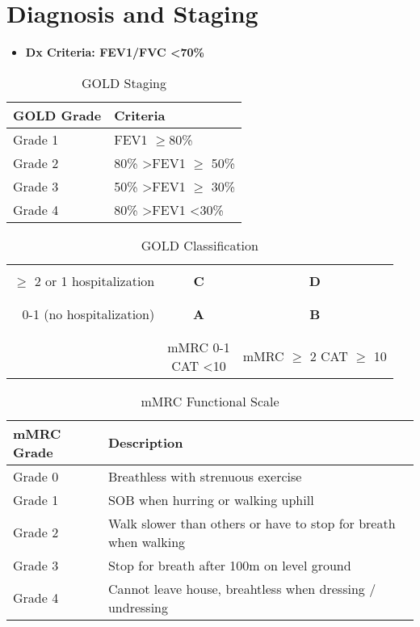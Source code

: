 \documentclass[main.tex]{subfiles}
\begin{document}
\section{Diagnosis and Staging}

\begin{itemize}[noitemsep]
	\item \textbf{Dx Criteria: FEV1/FVC \textless 70\%}
\end{itemize}

\begin{table}[h]
	\centering
	\caption{GOLD Staging}
	\begin{tabular}{l l}
		\textbf{GOLD Grade} & \textbf{Criteria}\\ \hline
		Grade 1 & FEV1 $\ge$80\%\\
		Grade 2 & 80\% \textgreater FEV1 $\ge$ 50\%\\ 
		Grade 3 & 50\% \textgreater FEV1 $\ge$ 30\%\\
		Grade 4 & 80\% \textgreater FEV1 \textless 30\%\\ 
	\end{tabular}
\end{table}

\begin{table}[h]
	\centering
	\caption{GOLD Classification}
	\begin{tabular}{r | c | c |}
		\hline && \\
		$\ge$ 2 or 1 hospitalization & \textbf{\huge C} & \textbf{\huge D} \\
		&& \\ \hline
		&& \\
		0-1 (no hospitalization) & \textbf{\huge A} & \textbf{\huge B} \\
		&& \\ \hline
		&& \\
		& \parbox{1in}{\centering mMRC 0-1 \newline CAT \textless 10} & \parbox{1in}{\centering mMRC $\ge$ 2 \newline CAT $\ge$ 10} \\
	\end{tabular}
\end{table}

\begin{table}[h]
	\centering
	\caption{mMRC Functional Scale}
	\begin{tabular}{l m{3in}}
		\textbf{mMRC Grade} & \textbf{Description} \\ \hline
		Grade 0 & Breathless with strenuous exercise \\
		Grade 1 & SOB when hurring or walking uphill \\
		Grade 2 & Walk slower than others or have to stop for breath when walking \\
		Grade 3 & Stop for breath after 100m on level ground \\
		Grade 4 & Cannot leave house, breahtless when dressing / undressing
	\end{tabular}
\end{table}
\end{document}

